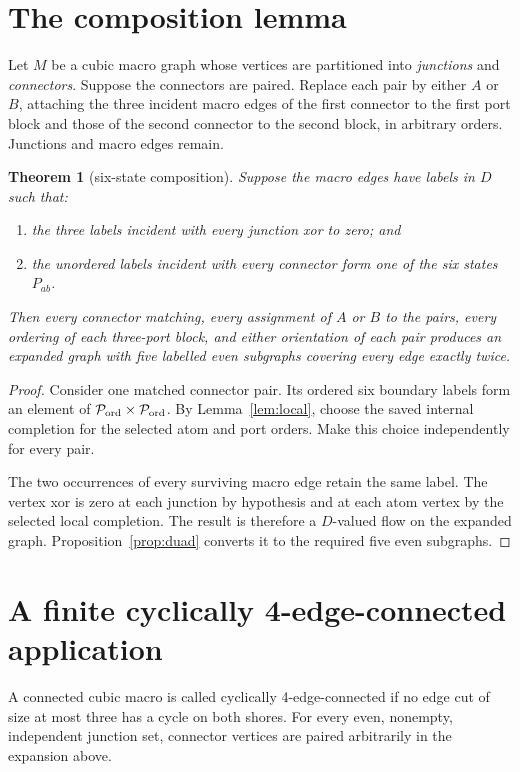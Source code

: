 \documentclass[11pt]{article}
\newtheorem{theorem}{Theorem}
\theoremstyle{definition}
\begin{document}
\section{The composition lemma}

Let $M$ be a cubic macro graph whose vertices are partitioned into
\emph{junctions} and \emph{connectors}.  Suppose the connectors are paired.
Replace each pair by either $A$ or $B$, attaching the three incident macro
edges of the first connector to the first port block and those of the second
connector to the second block, in arbitrary orders.  Junctions and macro
edges remain.

\begin{theorem}[six-state composition]\label{thm:composition}
Suppose the macro edges have labels in $D$ such that:
\begin{enumerate}
  \item the three labels incident with every junction xor to zero; and
  \item the unordered labels incident with every connector form one of the
        six states $P_{ab}$.
\end{enumerate}
Then every connector matching, every assignment of $A$ or $B$ to the pairs,
every ordering of each three-port block, and either orientation of each pair
produces an expanded graph with five labelled even subgraphs covering every
edge exactly twice.
\end{theorem}

\begin{proof}
Consider one matched connector pair.  Its ordered six boundary labels form
an element of $\mathcal P_{\rm ord}\times\mathcal P_{\rm ord}$.  By
Lemma~\ref{lem:local}, choose the saved internal completion for the selected
atom and port orders.  Make this choice independently for every pair.

The two occurrences of every surviving macro edge retain the same label.
The vertex xor is zero at each junction by hypothesis and at each atom vertex
by the selected local completion.  The result is therefore a $D$-valued
flow on the expanded graph.  Proposition~\ref{prop:duad} converts it to the
required five even subgraphs.
\end{proof}

\section{A finite cyclically 4-edge-connected application}

A connected cubic macro is called cyclically 4-edge-connected if no edge cut
of size at most three has a cycle on both shores.  For every even, nonempty,
independent junction set, connector vertices are paired arbitrarily in the
expansion above.
\end{document}
